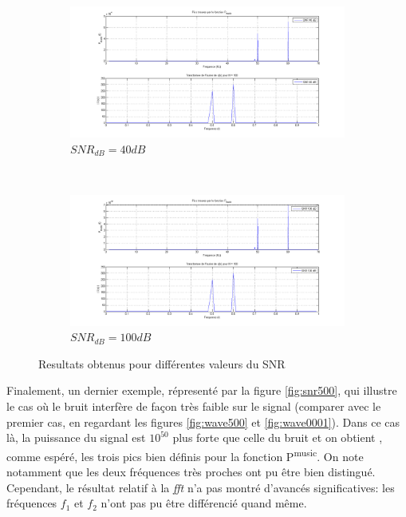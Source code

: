 \documentclass{article}
\newcommand{\rapportFigureMoyenne}{0.22}
\begin{document}
\begin{figure}[h]
%
    \centering
    \begin{subfigure}{0.49\textwidth}
        \includegraphics[scale=\rapportFigureMoyenne ]{images/snr40}
        \caption{\(SNR_{dB} = 40 dB\)}
        \label{fig:snr40}
    \end{subfigure}
    ~
    \begin{subfigure}{0.49\textwidth}
        \includegraphics[scale=\rapportFigureMoyenne ]{images/snr100}
        \caption{ \(SNR_{dB} = 100 dB\)}
        \label{fig:snr100}
    \end{subfigure}
    
    \caption{Resultats obtenus pour différentes valeurs du SNR}
%
\end{figure}

\FloatBarrier


Finalement, un dernier exemple, répresenté par la figure \ref{fig:snr500}, qui illustre le cas où le bruit interfère de façon très faible sur le signal (comparer avec le premier cas, en regardant les figures \ref{fig:wave500} et \ref{fig:wave0001}). Dans ce cas là, la puissance du signal est \(10^{50}\) plus forte que celle du bruit et on obtient , comme espéré, les trois pics bien définis pour la fonction P\textsuperscript{music}. On note notamment que les deux fréquences très proches ont pu être bien distingué. Cependant, le résultat relatif à la \textit{fft} n'a pas montré d'avancés significatives: les fréquences \(f_1\) et \(f_2\) n'ont pas pu être différencié quand même.
\end{document}
